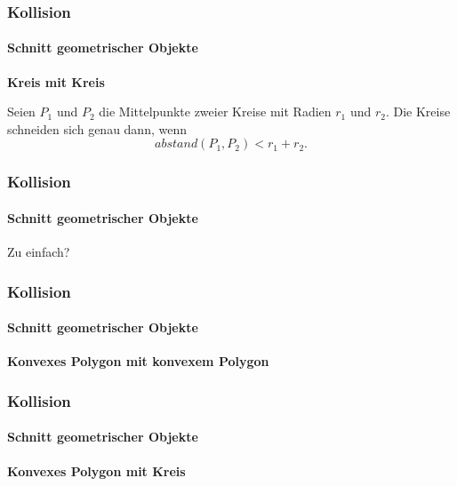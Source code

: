 \documentclass[dvips,12pt,xcolor=table]{beamer}
\begin{document}
\begin{frame}
\frametitle{Kollision}
\framesubtitle{Schnitt geometrischer Objekte}
\textbf{Kreis mit Kreis}

Seien $P_{1}$ und $P_{2}$ die Mittelpunkte zweier Kreise
mit Radien $r_{1}$ und $r_{2}$.
Die Kreise schneiden sich genau dann, wenn
\[ abstand(P_{1}, P_{2}) < r_{1} + r_{2}. \]
\end{frame}

\begin{frame}
\frametitle{Kollision}
\framesubtitle{Schnitt geometrischer Objekte}
\begin{center}
{\LARGE Zu einfach?} \\
\vspace{0.4cm}
\end{center}
\end{frame}

\begin{frame}
\frametitle{Kollision}
\framesubtitle{Schnitt geometrischer Objekte}
\textbf{Konvexes Polygon mit konvexem Polygon}

\end{frame}

\begin{frame}
\frametitle{Kollision}
\framesubtitle{Schnitt geometrischer Objekte}
\textbf{Konvexes Polygon mit Kreis}

\end{frame}
\end{document}
